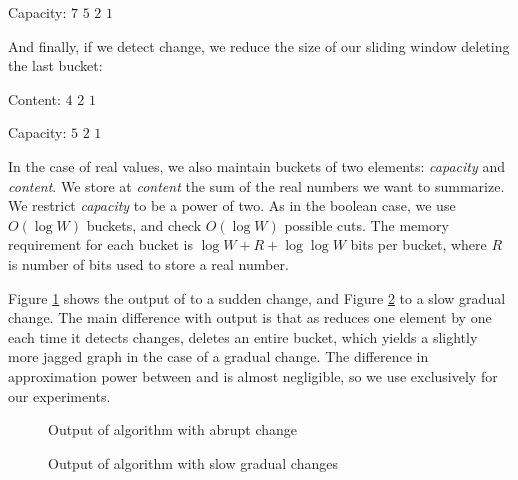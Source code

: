 \nopagebreak
Capacity:  $7$ \hspace{14pt} $5$  \hspace{16pt} $2$  \hspace{6pt} $1$ 
\medskip

\noindent
And finally, if we detect change, we reduce the size of our sliding window deleting the last bucket:

\medskip
\hspace{30pt}      
\smallskip

\nopagebreak
Content: \hspace{.2pt} $4$  \hspace{16pt} $2$ \hspace{6pt} $1$
\smallskip

\nopagebreak
Capacity:   $5$  \hspace{16pt} $2$  \hspace{6pt} $1$ 
\medskip

\noindent
In the case of real values, we also maintain buckets of two elements: 
{\em capacity} and {\em content}.
We store at {\em content} the sum of the real numbers we want to summarize.
We restrict {\em capacity} to be a power of two. As in the boolean case,
we use $O(\log W)$ buckets, and check $O(\log W)$ possible cuts. The memory requirement for each
bucket is $ \log W + R + \log \log W$ bits per bucket, where $R$ is number of bits used to store
a real number. 

Figure \ref{fig:ADWIN2-E} shows  the output of \adwintwo to a sudden change, 
and Figure \ref{fig:ADWIN2-R} to a slow gradual change.
The main difference with \adwintwo output is that as \adwinz reduces 
one element by one each time it detects changes, 
\adwintwo deletes an entire bucket, which yields a slightly more jagged
graph in the case of a gradual change. The difference in approximation 
power between \adwinz and \adwintwo is almost negligible, so we 
use \adwintwo exclusively for our experiments. 


\begin{figure}[t]
	\begin{center}
		
	\end{center}
	\caption{Output of algorithm \adwintwo with abrupt change} 
\label{fig:ADWIN2-E}
\end{figure}

\begin{figure}[h]
	\begin{center}
		
	\end{center}
\caption{Output of algorithm \adwintwo with slow gradual changes} 
\label{fig:ADWIN2-R}
\end{figure}

